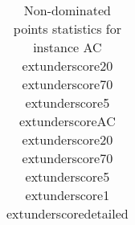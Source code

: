 \begin{table}
\caption{Non-dominated points statistics for instance AC	extunderscore20	extunderscore70	extunderscore5	extunderscoreAC	extunderscore20	extunderscore70	extunderscore5	extunderscore1	extunderscoredetailed}
\label{tab:stats/AC_20_70_5_AC_20_70_5_1_detailed}
\begin{tabular}{}
\toprule
\midrule
\bottomrule
\end{tabular}
\end{table}

